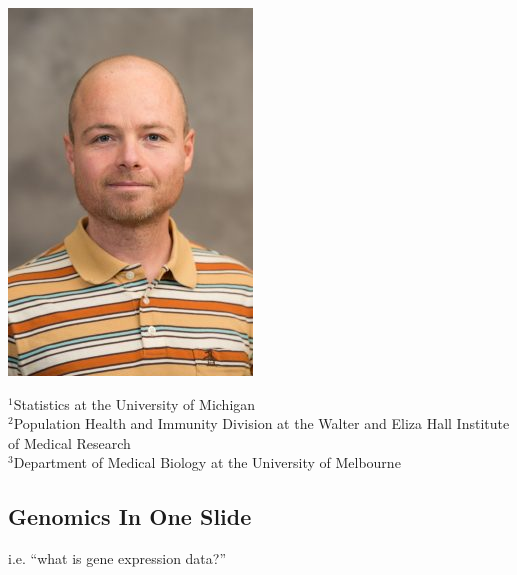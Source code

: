 \documentclass[usenames,dvipsnames,15pt]{beamer}
\begin{document}
{\begin{frame}[noframenumbering]
  \includegraphics[scale=.31]{pictures/johann.jpg}

  \vspace{.25cm}
  {\scriptsize ${}^1$Statistics at the University of Michigan\\
  ${}^2$Population Health and Immunity Division at the Walter and Eliza Hall Institute of Medical Research\\
  ${}^3$Department of Medical Biology at the University of Melbourne}
\end{frame}

\begin{frame}[noframenumbering]
  \section{Genomics In One Slide}
  \begin{center}
    i.e. ``what is gene expression data?''
  \end{center}
\end{frame}
}
\end{document}
